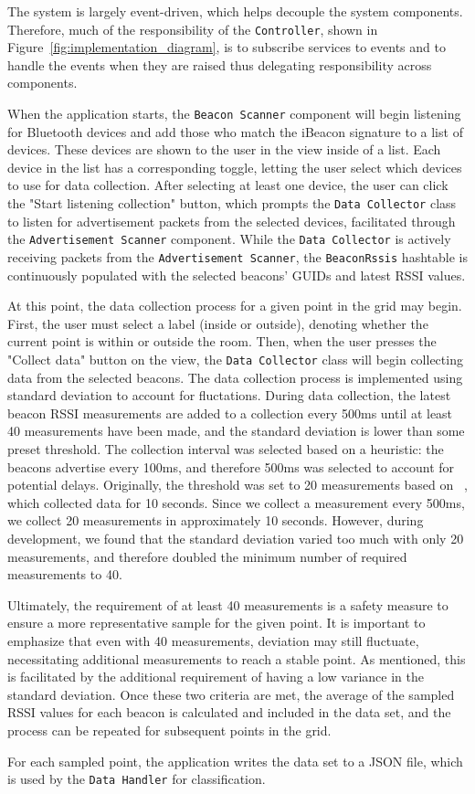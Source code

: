 The system is largely event-driven, which helps decouple the system components. 
Therefore, much of the responsibility of the \texttt{Controller}, shown in Figure~\ref{fig:implementation_diagram}, is to subscribe services to events and to handle the events when they are raised thus delegating responsibility across components. 

When the application starts, the \texttt{Beacon Scanner} component will begin listening for Bluetooth devices and add those who match the iBeacon signature to a list of devices.
These devices are shown to the user in the view inside of a list.
Each device in the list has a corresponding toggle, letting the user select which devices to use for data collection.
After selecting at least one device, the user can click the "Start listening collection" button, which prompts the \texttt{Data Collector} class to listen for advertisement packets from the selected devices, facilitated through the \texttt{Advertisement Scanner} component. 
While the \texttt{Data Collector} is actively receiving packets from the \texttt{Advertisement Scanner}, the \texttt{BeaconRssis} hashtable is continuously populated with the selected beacons' GUIDs and latest RSSI values.


At this point, the data collection process for a given point in the grid may begin.
First, the user must select a label (inside or outside), denoting whether the current point is within or outside the room.
Then, when the user presses the "Collect data" button on the view, the \texttt{Data Collector} class will begin collecting data from the selected beacons.
The data collection process is implemented using standard deviation to account for fluctations.
During data collection, the latest beacon RSSI measurements are added to a collection every 500ms until at least 40 measurements have been made, and the standard deviation is lower than some preset threshold.
The collection interval was selected based on a heuristic: the beacons advertise every 100ms, and therefore 500ms was selected to account for potential delays.
Originally, the threshold was set to 20 measurements based on \citeauthor{improving_indoor_localization}~\cite{improving_indoor_localization}, which collected data for 10 seconds.
Since we collect a measurement every 500ms, we collect 20 measurements in approximately 10 seconds. However, during development, we found that the standard deviation varied too much with only 20 measurements, and therefore doubled the minimum number of required measurements to 40.

Ultimately, the requirement of at least 40 measurements is a safety measure to ensure a more representative sample for the given point. 
It is important to emphasize that even with 40 measurements, deviation may still fluctuate, necessitating additional measurements to reach a stable point. 
As mentioned, this is facilitated by the additional requirement of having a low variance in the standard deviation. 
Once these two criteria are met, the average of the sampled RSSI values for each beacon is calculated and included in the data set, and the process can be repeated for subsequent points in the grid.

For each sampled point, the application writes the data set to a JSON file, which is used by the \texttt{Data Handler} for classification.